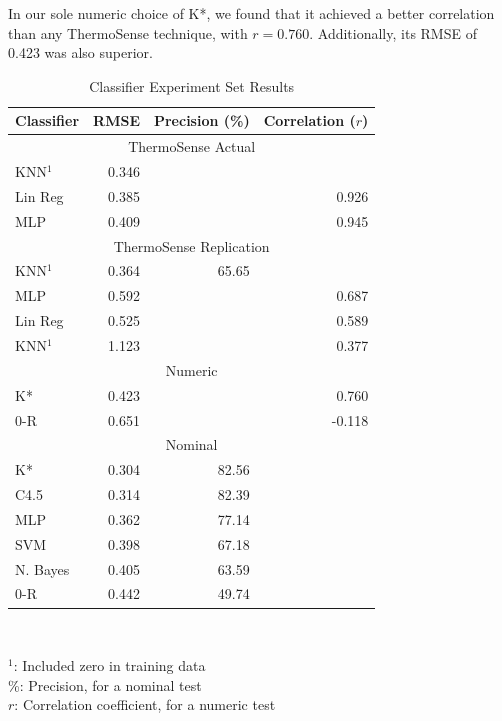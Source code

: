 \documentclass[../thesis/thesis.tex]{subfiles}
\begin{document}
In our sole numeric choice of K*, we found that it achieved a better correlation than any ThermoSense technique, with $r = 0.760$. Additionally, its RMSE of 0.423 was also superior.

\begin{table}
\centering
\begin{tabular}{|l|r|r|r|}
\hline
\textbf{Classifier} & \textbf{RMSE} & \textbf{Precision (\%)} & \textbf{Correlation ($r$)} \\ \hline
\multicolumn{4}{|c|}{\cellcolor{black!15} ThermoSense Actual}                         \\ \hline
KNN$^1$             & 0.346         &             &              \\ \hline
Lin Reg             & 0.385         &             & 0.926        \\ \hline
MLP                 & 0.409         &             & 0.945        \\ \hline
\multicolumn{4}{|c|}{\cellcolor{black!15} ThermoSense Replication}                    \\ \hline
KNN$^1$             & 0.364         & 65.65       &              \\ \hline
MLP                 & 0.592         &             & 0.687        \\ \hline
Lin Reg             & 0.525         &             & 0.589        \\ \hline
KNN$^1$             & 1.123         &             & 0.377        \\ \hline
\multicolumn{4}{|c|}{\cellcolor{black!15} Numeric}                                    \\ \hline
K*                  & 0.423         &             & 0.760        \\ \hline
0-R                 & 0.651         &             & -0.118       \\ \hline
\multicolumn{4}{|c|}{\cellcolor{black!15} Nominal}                                    \\ \hline
K*                  & 0.304         & 82.56       &              \\ \hline
C4.5                & 0.314         & 82.39       &              \\ \hline
MLP                 & 0.362         & 77.14       &              \\ \hline
SVM                 & 0.398         & 67.18       &              \\ \hline
N. Bayes            & 0.405         & 63.59       &              \\ \hline
0-R                 & 0.442         & 49.74       &              \\ \hline
\end{tabular}\\
\parbox{220pt}{
$^1$: Included zero in training data \\
\%: Precision, for a nominal test \\
$r$: Correlation coefficient, for a numeric test \\
}
\caption{Classifier Experiment Set Results}
\label{tab:results:set1}
\end{table}
\end{document}
